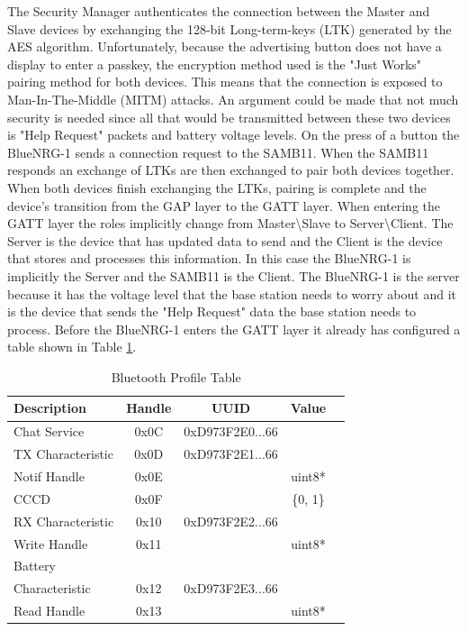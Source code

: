 \documentclass[journal,compsoc]{IEEEtran}
\begin{document}
The Security Manager authenticates the connection between the Master and Slave devices by exchanging the 128-bit Long-term-keys (LTK) generated by the AES algorithm. Unfortunately, because the advertising button does not have a display to enter a passkey, the encryption method used is the "Just Works" pairing method for both devices. This means that the connection is exposed to Man-In-The-Middle (MITM) attacks. An argument could be made that not much security is needed since all that would be transmitted between these two devices is "Help Request" packets and battery voltage levels. On the press of a button the BlueNRG-1 sends a connection request to the SAMB11. When the SAMB11 responds an exchange of LTKs are then exchanged to pair both devices together.  When both devices finish exchanging the LTKs, pairing is complete and the device's transition from the GAP layer to the GATT layer. When entering the GATT layer the roles implicitly change from Master\textbackslash Slave to Server\textbackslash Client.
The Server is the device that has updated data to send and the Client is the device that stores and processes this information. In this case the BlueNRG-1 is implicitly the Server and the SAMB11 is the Client. The BlueNRG-1 is the server because it has the voltage level that the base station needs to worry about and it is the device that sends the "Help Request" data the base station needs to process. Before the BlueNRG-1 enters the GATT layer it already has configured a table shown in Table \ref{BT Access}. 
\begin{table}[H]
\centering
\caption{Bluetooth Profile Table}
  \begin{tabular}{|l|c|c|c|c|}
      \hline
      Description         &Handle& UUID              & Value\\
      \hline
      Chat Service 	      & 0x0C & 0xD973F2E0...66   & \\
      \hline
      TX Characteristic   & 0x0D & 0xD973F2E1...66   & \\
      \hline
      Notif Handle	      & 0x0E & 				     & uint8*\\
      \hline
      CCCD                & 0x0F & 			         & \{0, 1\}\\
      \hline
      RX Characteristic   & 0x10 & 0xD973F2E2...66   & \\
      \hline
      Write Handle		  & 0x11 &					 & uint8*\\
      \hline
      Battery 		      &		 &					 & \\
      Characteristic	  & 0x12 & 0xD973F2E3...66   & \\
      \hline
      Read Handle		  & 0x13 & 					 & uint8*\\
      \hline
  \end{tabular}
  \label{BT Access}
\end{table}
\end{document}
